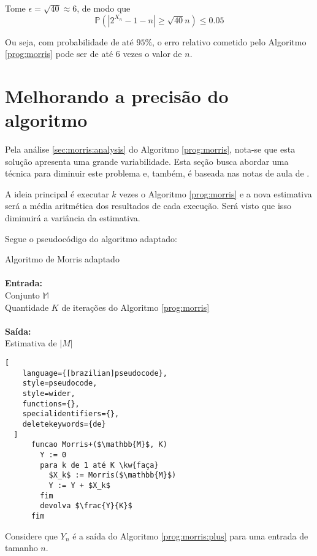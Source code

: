 Tome $\epsilon = \sqrt{40} \approx 6 $, de modo que 
\[ \mathbb{P}(|2^{X_n} - 1 - n| \geq \sqrt{40} n)  \leq 0.05 \]

Ou seja, com probabilidade de até $95\%$, o erro relativo cometido pelo Algoritmo \ref{prog:morris} pode ser de até $6$ vezes o valor de $n$.


\section{Melhorando a precisão do algoritmo}

Pela análise \ref{sec:morris:analysis} do Algoritmo \ref{prog:morris}, nota-se que esta solução apresenta uma grande variabilidade. 
Esta seção busca abordar uma técnica para diminuir este problema e, também, é baseada nas notas de aula de \citep{LectureNotesAndoni}.

A ideia principal é executar $k$ vezes o Algoritmo \ref{prog:morris} e a nova estimativa será a média aritmética dos resultados
de cada execução. Será visto que isso diminuirá a variância da estimativa.

Segue o pseudocódigo do algoritmo adaptado:
\begin{programruledcaption}{
Algoritmo de Morris adaptado\label{prog:morris:plus}\\
\\ \textbf{Entrada:} \\
\hspace*{1cm} Conjunto $\mathbb{M}$ \\
\hspace*{1cm} Quantidade $K$ de iterações do Algoritmo \ref{prog:morris} \\
\\ \textbf{Saída:} \\
\hspace*{1cm} Estimativa de $|M|$
\\
\label{prog:flajolet-martin}
}
  \begin{lstlisting}[
    language={[brazilian]pseudocode},
    style=pseudocode,
    style=wider,
    functions={},
    specialidentifiers={},
    deletekeywords={de}
  ]
      funcao Morris+($\mathbb{M}$, K)
        Y := 0
        para k de 1 até K \kw{faça}
          $X_k$ := Morris($\mathbb{M}$)
          Y := Y + $X_k$
        fim
        devolva $\frac{Y}{K}$
      fim
  \end{lstlisting}
\end{programruledcaption}

Considere que $Y_n$ é a saída do Algoritmo \ref{prog:morris:plus} para uma entrada de tamanho $n$.

